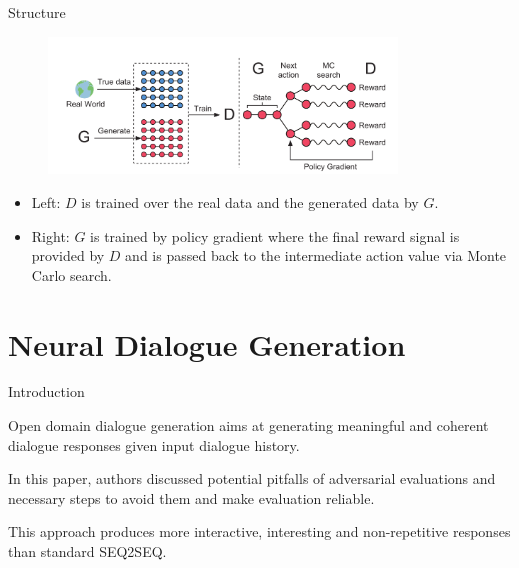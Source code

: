 \documentclass[10pt]{beamer}
\newcommand{\subtitlepage}[3]{\title{#1}\subtitle{#2}\author{#3}\date{}\begin{frame}[plain]\titlepage\end{frame}}
\begin{document}
	\begin{frame}{Structure}
		\begin{figure}
			\includegraphics[width=25em]{figures/SeqGAN-general-structure.png}
		\end{figure}
		\begin{itemize}
			\item Left: $D$ is trained over the real data and the generated data by $G$.
			\item Right: $G$ is trained by policy gradient where the final reward signal is provided by $D$ and is passed back to the intermediate action value via Monte Carlo search.
		\end{itemize}
	\end{frame}
	
	\part{Neural Dialogue Generation}
	\subtitlepage{}{Adversarial Learning for Neural Dialogue Generation}{Jiwei Li, Will Monroe, Tianlin Shi, Alan Ritter and Dan Jurafsky\\arXiv: 1701.06547}
	\begin{frame}{Introduction}
		\item Open domain dialogue generation aims at generating meaningful and coherent dialogue responses given input dialogue history.
		\item In this paper, authors discussed potential pitfalls of adversarial evaluations and necessary steps to avoid them and make evaluation reliable.
		\item This approach produces more interactive, interesting and non-repetitive responses than standard SEQ2SEQ.
	\end{frame}
\end{document}
